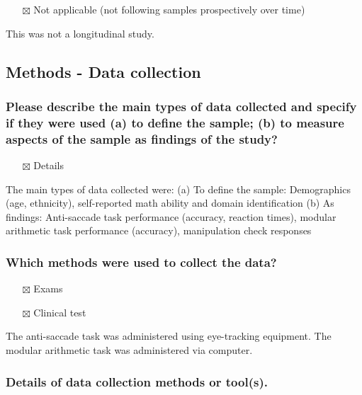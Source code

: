 \documentclass[
  doc, a4paper]{apa7}
\providecommand{\tightlist}{%
  \setlength{\itemsep}{0pt}\setlength{\parskip}{0pt}}
\begin{document}
\begin{itemize}
\tightlist
\item[$\boxtimes$]
  Not applicable (not following samples prospectively over time)
\end{itemize}

This was not a longitudinal study.

\subsection{Methods - Data collection}\label{methods---data-collection}

\subsubsection{Please describe the main types of data collected and specify if they were used (a) to define the sample; (b) to measure aspects of the sample as findings of the study?}\label{please-describe-the-main-types-of-data-collected-and-specify-if-they-were-used-a-to-define-the-sample-b-to-measure-aspects-of-the-sample-as-findings-of-the-study}

\begin{itemize}
\tightlist
\item[$\boxtimes$]
  Details
\end{itemize}

The main types of data collected were:
(a) To define the sample: Demographics (age, ethnicity), self-reported math ability and domain identification
(b) As findings: Anti-saccade task performance (accuracy, reaction times), modular arithmetic task performance (accuracy), manipulation check responses

\subsubsection{Which methods were used to collect the data?}\label{which-methods-were-used-to-collect-the-data}

\begin{itemize}
\tightlist
\item[$\boxtimes$]
  Exams
\item[$\boxtimes$]
  Clinical test
\end{itemize}

The anti-saccade task was administered using eye-tracking equipment. The modular arithmetic task was administered via computer.

\subsubsection{Details of data collection methods or tool(s).}\label{details-of-data-collection-methods-or-tools.}
\end{document}
